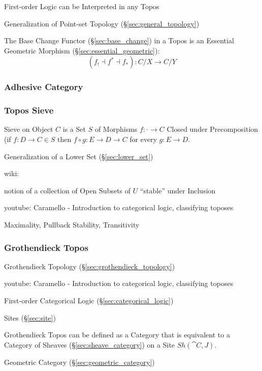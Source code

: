 First-order Logic can be Interpreted in any Topos

Generalization of Point-set Topology (\S\ref{sec:general_topology})

The Base Change Functor (\S\ref{sec:base_change}) in a Topos is an
Essential Geometric Morphism (\S\ref{sec:essential_geometric}):
\[
  (f_! \dashv f^* \dashv f_*):C/X \rightarrow C/Y
\]



\subsubsection{Adhesive Category}\label{sec:adhesive_category}

\subsubsection{Topos Sieve}\label{sec:topos_sieve}

Sieve on Object $C$ is a Set $S$ of Morphisms $f : \cdot \rightarrow
C$ Closed under Precomposition (if $f : D \rightarrow C \in S$ then $f
\circ g : E \rightarrow D \rightarrow C$ for every $g : E \rightarrow
D$.

Generalization of a Lower Set (\S\ref{sec:lower_set})

wiki:

notion of a collection of Open Subsets of $U$ ``stable'' under
Inclusion %

youtube: Caramello - Introduction to categorical logic, classifying
toposes

Maximality, Pullback Stability, Transitivity %



\subsubsection{Grothendieck Topos}\label{sec:grothendieck_topos}

Grothendieck Topology (\S\ref{sec:grothendieck_topology})

youtube: Caramello - Introduction to categorical logic, classifying
toposes

First-order Categorical Logic (\S\ref{sec:categorical_logic})

Sites (\S\ref{sec:site})

Grothendieck Topos can be defined as a Category that is equivalent to
a Category of Sheaves (\S\ref{sec:sheave_category}) on a Site
$Sh(\cat{C},J)$.

Geometric Category (\S\ref{sec:geometric_category})

